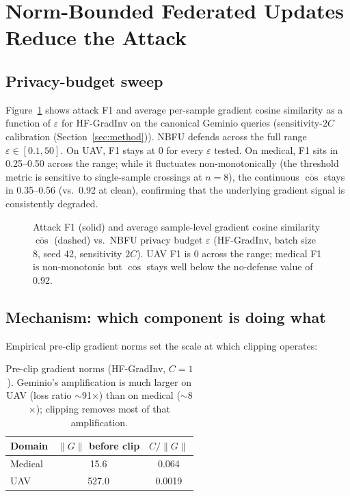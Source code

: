 \documentclass[11pt]{article}
\begin{document}
\section{Norm-Bounded Federated Updates Reduce the Attack}
\label{sec:nbfu}

\subsection{Privacy-budget sweep}
Figure~\ref{fig:eps} shows attack F1 and average per-sample gradient cosine similarity as a function of $\varepsilon$ for HF-GradInv on the canonical Geminio queries (sensitivity-$2C$ calibration (Section~\ref{sec:method})). NBFU defends across the full range $\varepsilon \in [0.1, 50]$. On UAV, F1 stays at 0 for every $\varepsilon$ tested. On medical, F1 sits in 0.25--0.50 across the range; while it fluctuates non-monotonically (the threshold metric is sensitive to single-sample crossings at $n{=}8$), the continuous $\overline{\cos}$ stays in 0.35--0.56 (vs.\ 0.92 at clean), confirming that the underlying gradient signal is consistently degraded.

\begin{figure}[t]
\centering

\caption{Attack F1 (solid) and average sample-level gradient cosine similarity $\overline{\cos}$ (dashed) vs.\ NBFU privacy budget $\varepsilon$ (HF-GradInv, batch size 8, seed 42, sensitivity $2C$). UAV F1 is 0 across the range; medical F1 is non-monotonic but $\overline{\cos}$ stays well below the no-defense value of 0.92.}
\label{fig:eps}
\end{figure}

\subsection{Mechanism: which component is doing what}
\label{sec:nbfu-mechanism}
Empirical pre-clip gradient norms set the scale at which clipping operates:
\begin{table}[h]
\centering
\small
\begin{tabular}{lcc}
\toprule
Domain & $\|G\|$ before clip & $C/\|G\|$ \\
\midrule
Medical & 15.6 & 0.064 \\
UAV & 527.0 & 0.0019 \\
\bottomrule
\end{tabular}
\caption{Pre-clip gradient norms (HF-GradInv, $C{=}1$). Geminio's amplification is much larger on UAV (loss ratio $\sim$91$\times$) than on medical ($\sim$8$\times$); clipping removes most of that amplification.}
\label{tab:gradnorms}
\end{table}
\end{document}
